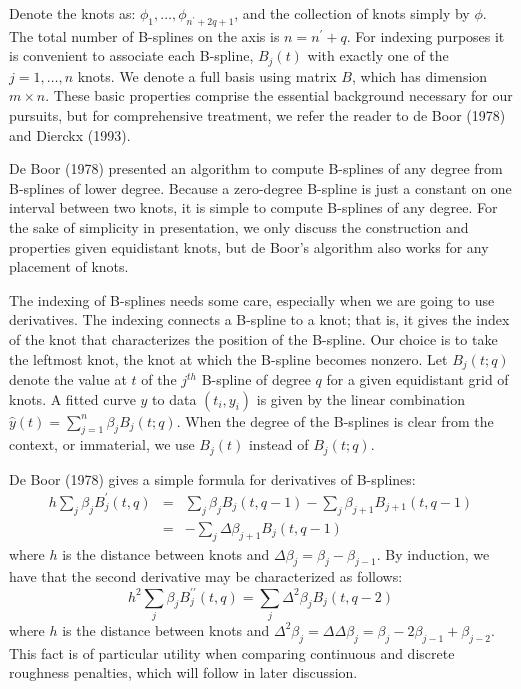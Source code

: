 \documentclass[12pt]{article}
\newcommand*\needsparaphrased{\color{red}}
\begin{document}
Denote the knots as: $\phi_1,\dots ,\phi_{n^\prime+2q+1}$, and the collection of knots simply by $\phi$. The total number of B-splines on the axis is $n = n^\prime + q$. For indexing purposes it is convenient to associate each B-spline, $B_j\left(t\right)$ with exactly one of the $j = 1, \dots , n$ knots. We denote a full basis using matrix $B$, which has dimension $m \times n$. These basic properties comprise the essential background necessary for our pursuits, but for comprehensive treatment, we refer the reader to de Boor (1978) and Dierckx (1993).

{\needsparaphrased De Boor (1978)} presented an algorithm to compute B-splines of any degree from B-splines of lower degree. Because a zero-degree B-spline is just a constant on one interval between two knots, it is simple to compute B-splines of any degree. For the sake of simplicity in presentation, we only discuss the construction and properties given equidistant knots, but de Boor's algorithm also works for any placement of knots.

The indexing of B-splines needs some care, especially when we are going to use derivatives. The indexing connects a B-spline to a knot; that is, it gives the index of the knot that characterizes the position of the B-spline. Our choice is to take the leftmost knot, the knot at which the B-spline becomes nonzero. Let $B_j\left(t; q\right)$ denote the value at $t$ of the $j^{th}$ B-spline of degree $q$ for a given equidistant grid of knots. A fitted curve $\hat{y}$ to data $\left(t_i,y_i\right)$ is given by the linear combination $\hat{y}\left(t\right) = \sum_{j=1}^n \beta_{j} B_j\left(t; q\right)$. When the degree of the B-splines is clear from the context, or immaterial, we use $B_j\left(t\right)$ instead of $B_j\left(t; q\right)$.

De Boor (1978) gives a simple formula for derivatives of B-splines:
\begin{eqnarray}
h\sum_{j} \beta_j B_j^\prime \left(t,q\right) &=& \sum_{j} \beta_j B_j\left(t,q-1\right)-\sum_{j} \beta_{j+1} B_{j+1} \left(t,q-1\right) \nonumber \\ 
&=& -\sum_{j} \Delta\beta_{j+1} B_{j} \left(t,q-1\right) \label{bspline_deriv}
\end{eqnarray}
\noindent
where $h$ is the distance between knots and $\Delta \beta_j = \beta_j-\beta_{j-1}$. By induction, we have that the second derivative may be characterized as follows:
\begin{equation}
h^2\sum_{j} \beta_j B_j^{\prime \prime} \left(t,q\right) = \sum_{j} \Delta^2 \beta_{j} B_{j} \left(t,q-2\right) \label{bspline_2nd_deriv}
\end{equation}
\noindent
where $h$ is the distance between knots and $\Delta^2 \beta_j = \Delta\Delta \beta_j = \beta_j - 2\beta_{j-1}+\beta_{j-2} $. This fact is of particular utility when comparing continuous and discrete roughness penalties, which will follow in later discussion.
\end{document}
